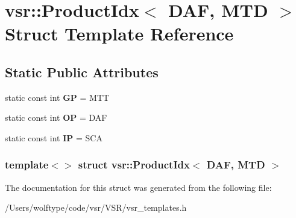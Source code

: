 \hypertarget{structvsr_1_1_product_idx_3_01_d_a_f_00_01_m_t_d_01_4}{\section{vsr\-:\-:Product\-Idx$<$ D\-A\-F, M\-T\-D $>$ Struct Template Reference}
\label{structvsr_1_1_product_idx_3_01_d_a_f_00_01_m_t_d_01_4}
}
\subsection*{Static Public Attributes}
\begin{DoxyCompactItemize}
\item 
\hypertarget{structvsr_1_1_product_idx_3_01_d_a_f_00_01_m_t_d_01_4_a53170dd35b9f0b654fd05e4d842b3eb8}{static const int {\bfseries G\-P} = M\-T\-T}\label{structvsr_1_1_product_idx_3_01_d_a_f_00_01_m_t_d_01_4_a53170dd35b9f0b654fd05e4d842b3eb8}

\item 
\hypertarget{structvsr_1_1_product_idx_3_01_d_a_f_00_01_m_t_d_01_4_a88411fd451f47e087ffde619f52f2208}{static const int {\bfseries O\-P} = D\-A\-F}\label{structvsr_1_1_product_idx_3_01_d_a_f_00_01_m_t_d_01_4_a88411fd451f47e087ffde619f52f2208}

\item 
\hypertarget{structvsr_1_1_product_idx_3_01_d_a_f_00_01_m_t_d_01_4_ae5da5e1e2c59e959586421ce6bf181de}{static const int {\bfseries I\-P} = S\-C\-A}\label{structvsr_1_1_product_idx_3_01_d_a_f_00_01_m_t_d_01_4_ae5da5e1e2c59e959586421ce6bf181de}

\end{DoxyCompactItemize}
\subsubsection*{template$<$$>$ struct vsr\-::\-Product\-Idx$<$ D\-A\-F, M\-T\-D $>$}



The documentation for this struct was generated from the following file\-:\begin{DoxyCompactItemize}
\item 
/\-Users/wolftype/code/vsr/\-V\-S\-R/vsr\-\_\-templates.\-h\end{DoxyCompactItemize}
